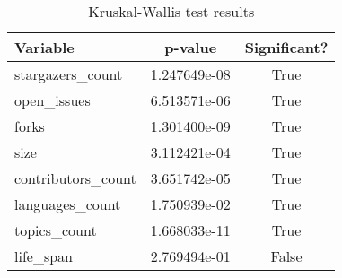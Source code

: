 \begin{table}
\centering
\caption{Kruskal-Wallis test results}
\label{tab:kruskal_wallis}
\begin{tabular}{lcc}
\toprule
          Variable &      p-value &  Significant? \\
\midrule
  stargazers\_count & 1.247649e-08 &          True \\
       open\_issues & 6.513571e-06 &          True \\
             forks & 1.301400e-09 &          True \\
              size & 3.112421e-04 &          True \\
contributors\_count & 3.651742e-05 &          True \\
   languages\_count & 1.750939e-02 &          True \\
      topics\_count & 1.668033e-11 &          True \\
         life\_span & 2.769494e-01 &         False \\
\bottomrule
\end{tabular}
\end{table}
